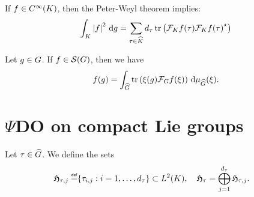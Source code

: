 \begin{example}
    If $f \in \SmoothFunctions{\CompactGroup}$,
    then the Peter-Weyl theorem implies:
    \begin{align*}
        \int_\CompactGroup \abs{f}^2 \dd g
        = \sum_{\tau \in \dualGroup\CompactGroup}
            \dimRep\tau
            \tr \left(
                \Fourier[\CompactGroup] f(\tau)
                \adj{\Fourier[\CompactGroup] f(\tau)}
            \right)
    \end{align*}
\end{example}

\begin{proposition}
    Let $g \in \Group$.
    If $f \in \Schwartz\Group$,
    then we have
    \begin{align*}
        f(g) =
        \int_\dualGroup\Group
            \tr\left(
                \xi(g)
                \Fourier f(\xi)
            \right)
        \dd \Plancherel\Group(\xi).
    \end{align*}
\end{proposition}

\section{$\Psi$DO on compact Lie groups}

\begin{definition}
    Let $\tau \in \dualGroup\Group$.
    We define the sets
    \begin{align*}
        \HilbertCompactGroupColumn{\tau}{j} \defeq \span \{ \tau_{i, j} : i = 1, \dots, \dimRep\tau \}
        \subset \Lebesgue{2}\CompactGroup, \quad
        \HilbertCompactGroup{\tau} = \bigoplus_{j = 1}^\dimRep\tau \HilbertCompactGroupColumn{\tau}{j}.
    \end{align*}
\end{definition}

